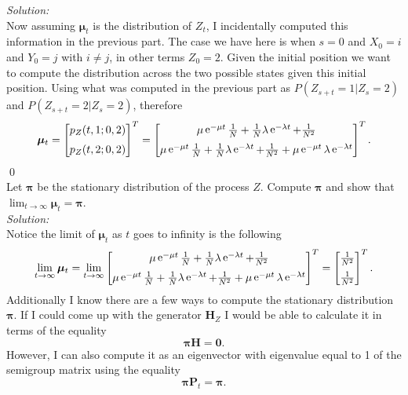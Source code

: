 \documentclass[10pt]{amsart}
\DeclareMathOperator{\E}{e}
\begin{document}
\noindent
\textit{Solution:} \\
Now assuming $\bm \mu_t$ is the distribution of $Z_t$, I incidentally computed this information in the previous part.
The case we have here is when $s = 0$ and $X_0 = i$ and $Y_0 = j$ with $i \neq j$, in other terms $Z_0 = 2$.
Given the initial position we want to compute the distribution across the two possible states given this initial position.
Using what was computed in the previous part as $P(Z_{s + t} = 1 | Z_s = 2)$ and $P(Z_{s + t} = 2 | Z_s = 2)$, therefore
\begin{align*}
\bm \mu_t = \begin{bmatrix}
p_Z(t,1;0,2) \vspace{2 mm} \\ 
p_Z(t,2;0,2)
\end{bmatrix}^T
	= \begin{bmatrix}
\mu\E^{-\mu t } \frac 1 N + \frac 1 N \lambda\E^{-\lambda t} + \frac 1 {N^2} \vspace{2 mm} \\
\mu\E^{-\mu t} \frac 1 N + \frac 1 N \lambda\E^{-\lambda t} + \frac 1 {N^2} + \mu\E^{-\mu t } \lambda\E^{-\lambda t }
\end{bmatrix}^T.
\end{align*}
\qed
\\

 Let ${\bm \pi}$ be the stationary distribution of the process $Z$. Compute ${\bm \pi}$  and show that $\lim_{t\to\infty}{\bm \mu}_t={\bm \pi}$. \\

\noindent
\textit{Solution: } \\
Notice the limit of $\bm \mu_t$ as $t$ goes to infinity is the following
$$
\lim_{t \rightarrow \infty} \bm \mu_t
	= \lim_{t \rightarrow \infty} \begin{bmatrix}
\mu\E^{-\mu t } \frac 1 N + \frac 1 N \lambda\E^{-\lambda t} + \frac 1 {N^2} \vspace{2 mm} \\
\mu\E^{-\mu t} \frac 1 N + \frac 1 N \lambda\E^{-\lambda t} + \frac 1 {N^2} + \mu\E^{-\mu t } \lambda\E^{-\lambda t }
\end{bmatrix}^T
	= \begin{bmatrix}
	\frac 1 {N^2} \vspace{2 mm} \\
	\frac 1 {N^2}
	\end{bmatrix}^T.
$$
Additionally I know there are a few ways to compute the stationary distribution $\bm \pi$.
If I could come up with the generator $\bm H_Z$ I would be able to calculate it in terms of the equality
$$\bm \pi \bm H = \bm 0.$$
However, I can also compute it as an eigenvector with eigenvalue equal to 1 of the semigroup matrix using the equality
$$\bm \pi \bm P_t = \bm \pi.$$
\end{document}
